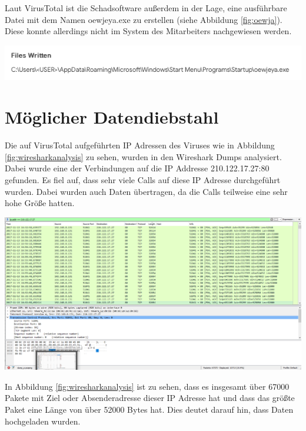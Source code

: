 Laut VirusTotal ist die Schadsoftware außerdem in der Lage, eine ausführbare Datei mit dem Namen oewjeya.exe zu erstellen (siehe Abbildung \ref{fig:oewja}).
Diese konnte allerdings nicht im System des Mitarbeiters nachgewiesen werden.

\begin{center}
	\includegraphics[width=15.8cm]{figures/oewja.png}
	\label{fig:oewja}
\end{center}

\chapter{Möglicher Datendiebstahl}
\label{ch:Datendiebstahl}
Die auf VirusTotal aufgeführten IP Adressen des Viruses wie in Abbildung \ref{fig:wiresharkanalysis} zu sehen, wurden in den Wireshark Dumps analysiert. Dabei wurde eine der Verbindungen auf die IP Addresse 210.122.17.27:80 gefunden. Es fiel auf, dass sehr viele Calls auf diese IP Adresse durchgeführt wurden. Dabei wurden auch Daten übertragen, da die Calls teilweise eine sehr hohe Größe hatten.

\begin{center}
	\includegraphics[width=15.8cm]{figures/wiresharkanalysis}
	\label{fig:wiresharkanalysis}
\end{center}

In Abbildung \ref{fig:wiresharkanalysis} ist zu sehen, dass es insgesamt über 67000 Pakete mit Ziel oder Absenderadresse dieser IP Adresse hat und dass das größte Paket eine Länge von über 52000 Bytes hat. Dies deutet darauf hin, dass Daten hochgeladen wurden.

